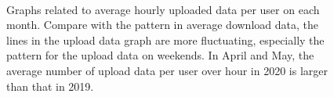 \begin{figure}[t]
    \\
  \hspace{0.2cm}
        
  \caption{Graphs related to average hourly uploaded data per user on each month. Compare with the pattern in average download data, the lines in the upload data graph are more fluctuating, especially the pattern for the upload data on weekends. In April and May, the average number of upload data per user over hour in 2020 is larger than that in 2019.}
  \label{fig:upload_data_per_user_hours_fig} 
\end{figure}


  

